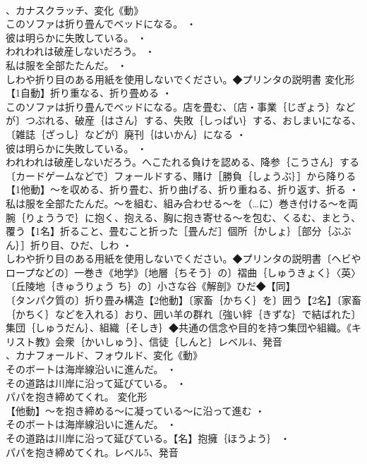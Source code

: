 \documentclass[8pt]{extreport}
\begin{document}
\begin{CJK}{UTF8}{min}
\\	、カナスクラッチ、変化《動》
\\	このソファは折り畳んでベッドになる。 ・
\\	彼は明らかに失敗している。 ・
\\	われわれは破産しないだろう。 ・
\\	私は服を全部たたんだ。 ・
\\	しわや折り目のある用紙を使用しないでください。◆プリンタの説明書	変化形 
\\	【1自動】折り重なる、折り畳める ・
\\	このソファは折り畳んでベッドになる。店を畳む、〔店・事業｛じぎょう｝などが〕つぶれる、破産｛はさん｝する、失敗｛しっぱい｝する、おしまいになる、〔雑誌｛ざっし｝などが〕廃刊｛はいかん｝になる ・
\\	彼は明らかに失敗している。 ・
\\	われわれは破産しないだろう。へこたれる負けを認める、降参｛こうさん｝する〔カードゲームなどで〕フォールドする、賭け［勝負｛しょうぶ｝］から降りる【1他動】～を収める、折り畳む、折り曲げる、折り重ねる、折り返す、折る ・
\\	私は服を全部たたんだ。～を組む、組み合わせる～を（…に）巻き付ける～を両腕｛りょううで｝に抱く、抱える、胸に抱き寄せる～を包む、くるむ、まとう、覆う【1名】折ること、畳むこと折った［畳んだ］個所｛かしょ｝［部分｛ぶぶん｝］折り目、ひだ、しわ ・
\\	しわや折り目のある用紙を使用しないでください。◆プリンタの説明書〔ヘビやロープなどの〕一巻き《地学》〔地層｛ちそう｝の〕褶曲｛しゅうきょく｝〈英〉〔丘陵地｛きゅうりょう ち｝の〕小さな谷《解剖》ひだ◆【同】
\\	〔タンパク質の〕折り畳み構造【2他動】〔家畜｛かちく｝を〕囲う【2名】〔家畜｛かちく｝などを入れる〕おり、囲い羊の群れ〔強い絆｛きずな｝で結ばれた〕集団｛しゅうだん｝、組織｛そしき｝◆共通の信念や目的を持つ集団や組織。《キリスト教》会衆｛かいしゅう｝、信徒｛しんと｝レベル4、発音
\\	、カナフォールド、フォウルド、変化《動》
\\	そのボートは海岸線沿いに進んだ。 ・
\\	その道路は川岸に沿って延びている。 ・
\\	パパを抱き締めてくれ。	変化形 
\\	【他動】～を抱き締める～に凝っている～に沿って進む ・
\\	そのボートは海岸線沿いに進んだ。 ・
\\	その道路は川岸に沿って延びている。【名】抱擁｛ほうよう｝ ・
\\	パパを抱き締めてくれ。レベル5、発音

\end{CJK}
\end{document}
